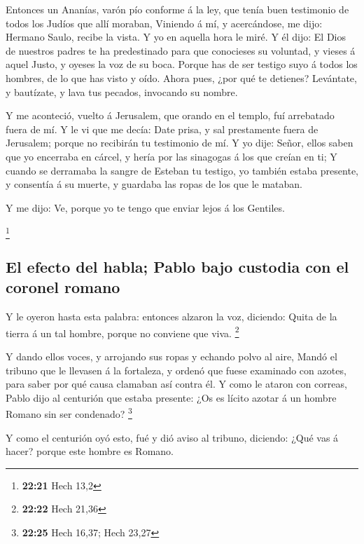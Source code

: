  Entonces un Ananías, varón pío conforme á la ley, que
tenía buen testimonio de todos los Judíos que allí moraban,
 Viniendo á mí, y acercándose, me dijo: Hermano Saulo,
recibe la vista. Y yo en aquella hora le miré.  Y él dijo:
El Dios de nuestros padres te ha predestinado para que conocieses su
voluntad, y vieses á aquel Justo, y oyeses la voz de su boca.
 Porque has de ser testigo suyo á todos los hombres, de lo
que has visto y oído.  Ahora pues, ¿por qué te detienes?
Levántate, y bautízate, y lava tus pecados, invocando su nombre.

 Y me aconteció, vuelto á Jerusalem, que orando en el
templo, fuí arrebatado fuera de mí.  Y le vi que me decía:
Date prisa, y sal prestamente fuera de Jerusalem; porque no recibirán tu
testimonio de mí.  Y yo dije: Señor, ellos saben que yo
encerraba en cárcel, y hería por las sinagogas á los que creían en ti;
 Y cuando se derramaba la sangre de Esteban tu testigo, yo
también estaba presente, y consentía á su muerte, y guardaba las ropas
de los que le mataban.

 Y me dijo: Ve, porque yo te tengo que enviar lejos á los
Gentiles.

\footnote{\textbf{22:21} Hech 13,2}

\hypertarget{el-efecto-del-habla-pablo-bajo-custodia-con-el-coronel-romano}{%
\subsection{El efecto del habla; Pablo bajo custodia con el coronel
romano}\label{el-efecto-del-habla-pablo-bajo-custodia-con-el-coronel-romano}}

 Y le oyeron hasta esta palabra: entonces alzaron la voz,
diciendo: Quita de la tierra á un tal hombre, porque no conviene que
viva. \footnote{\textbf{22:22} Hech 21,36}

 Y dando ellos voces, y arrojando sus ropas y echando polvo
al aire,  Mandó el tribuno que le llevasen á la fortaleza,
y ordenó que fuese examinado con azotes, para saber por qué causa
clamaban así contra él.  Y como le ataron con correas,
Pablo dijo al centurión que estaba presente: ¿Os es lícito azotar á un
hombre Romano sin ser condenado? \footnote{\textbf{22:25} Hech 16,37;
  Hech 23,27}

 Y como el centurión oyó esto, fué y dió aviso al tribuno,
diciendo: ¿Qué vas á hacer? porque este hombre es Romano.

